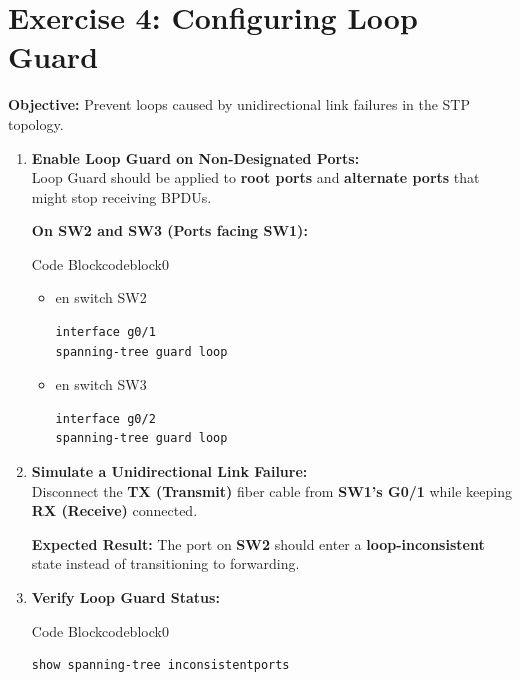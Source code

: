 \documentclass[a4paper]{book}
\begin{document}
\section*{Exercise 4: Configuring Loop Guard}

\textbf{Objective:} Prevent loops caused by unidirectional link failures in the STP topology.

\begin{enumerate}
	\item \textbf{Enable Loop Guard on Non-Designated Ports:} \\
	      Loop Guard should be applied to \textbf{root ports} and \textbf{alternate ports} that might stop receiving BPDUs.

	      \textbf{On SW2 and SW3 (Ports facing SW1):}



	      \begin{ocg}{Code Block}{codeblock}{0}
		      \vspace{0.5cm}
		      \begin{itemize}
			      \item en switch SW2
			            \begin{lstlisting}
interface g0/1
spanning-tree guard loop
                \end{lstlisting}
			      \item en switch SW3
			            \begin{lstlisting}
interface g0/2
spanning-tree guard loop
                \end{lstlisting}
		      \end{itemize}
	      \end{ocg}

	\item \textbf{Simulate a Unidirectional Link Failure:} \\
	      Disconnect the \textbf{TX (Transmit)} fiber cable from \textbf{SW1’s G0/1} while keeping \textbf{RX (Receive)} connected.

	      \textbf{Expected Result:} The port on \textbf{SW2} should enter a \textbf{loop-inconsistent} state instead of transitioning to forwarding.

	\item \textbf{Verify Loop Guard Status:}



	      \begin{ocg}{Code Block}{codeblock}{0}
		      \vspace{0.5cm}
		      \begin{lstlisting}
show spanning-tree inconsistentports
    \end{lstlisting}
	      \end{ocg}
\end{enumerate}
\end{document}
